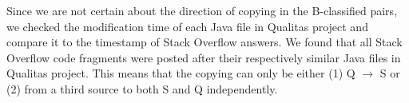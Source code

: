 \documentclass{sig-alternate-05-2015}
\begin{document}
Since we are not certain about the direction of copying in the B-classified pairs, we checked the modification time of each Java file in Qualitas project and compare it to the timestamp of Stack Overflow answers. We found that all Stack Overflow code fragments were posted after their respectively similar Java files in Qualitas project. This means that the copying can only be either (1) Q $\rightarrow$ S or (2) from a third source to both S and Q independently.


\begin{table}
	\centering
	\caption{Qualitas-\textit{O}: Classification results of \textit{good-} and \textit{ok}-match pairs which excludes the subsumed \textit{good}-match and Simian$_{\mathrm{\textit{EvaClone}}}$-NiCad$_{\mathrm{\textit{EvaClone}}}$ pairs.}
	\label{tab:classification_good_o}
	\small
\end{table}
\end{document}
